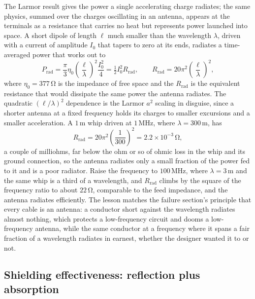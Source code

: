 The Larmor result gives the power a single accelerating charge radiates; the
same physics, summed over the charges oscillating in an antenna, appears at
the terminals as a resistance that carries no heat but represents power
launched into space. A short dipole of length $\ell$ much smaller than the
wavelength $\lambda$, driven with a current of amplitude $I_0$ that tapers to
zero at its ends, radiates a time-averaged power that works out to
\[
P_{\text{rad}} = \frac{\pi}{3}\eta_0\left(\frac{\ell}{\lambda}\right)^{2}
\frac{I_0^{2}}{4} = \tfrac12 I_0^{2} R_{\text{rad}}, \qquad
R_{\text{rad}} = 20\pi^{2}\left(\frac{\ell}{\lambda}\right)^{2},
\]
where $\eta_0 = 377\,\si{\ohm}$ is the impedance of free space and the
 $R_{\text{rad}}$ is the equivalent resistance
that would dissipate the same power the antenna radiates. The quadratic
$(\ell/\lambda)^{2}$ dependence is the Larmor $a^{2}$ scaling in disguise,
since a shorter antenna at a fixed frequency holds its charges to smaller
excursions and a smaller acceleration. A $1\,\si{\meter}$ whip driven at
$1\,\si{\mega\hertz}$, where $\lambda = 300\,\si{\meter}$, has
\[
R_{\text{rad}} = 20\pi^{2}\left(\frac{1}{300}\right)^{2} = 2.2\times 10^{-3}
\,\si{\ohm},
\]
a couple of milliohms, far below the ohm or so of ohmic loss in the whip and
its ground connection, so the antenna radiates only a small fraction of the
power fed to it and is a poor radiator. Raise the frequency to $100\,\si{
\mega\hertz}$, where $\lambda = 3\,\si{\meter}$ and the same whip is a third
of a wavelength, and $R_{\text{rad}}$ climbs by the square of the frequency
ratio to about $22\,\si{\ohm}$, comparable to the feed impedance, and the
antenna radiates efficiently. The lesson matches the failure section's
principle that every cable is an antenna: a conductor short against the
wavelength radiates almost nothing, which protects a low-frequency circuit and
dooms a low-frequency antenna, while the same conductor at a frequency where
it spans a fair fraction of a wavelength radiates in earnest, whether the
designer wanted it to or not.

\subsection{Shielding effectiveness: reflection plus absorption}

